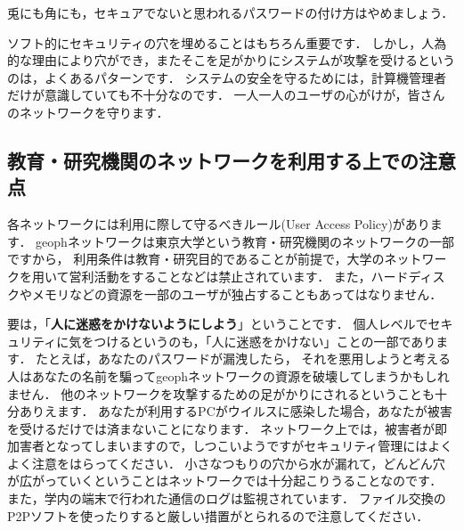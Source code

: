 \documentclass{jarticle}
\begin{document}
兎にも角にも，セキュアでないと思われるパスワードの付け方はやめましょう．

ソフト的にセキュリティの穴を埋めることはもちろん重要です．
しかし，人為的な理由により穴ができ，またそこを足がかりにシステムが攻撃を受けるというのは，よくあるパターンです．
システムの安全を守るためには，計算機管理者だけが意識していても不十分なのです．
一人一人のユーザの心がけが，皆さんのネットワークを守ります．

\subsection{教育・研究機関のネットワークを利用する上での注意点}
各ネットワークには利用に際して守るべきルール(User Access Policy)があります．
geophネットワークは東京大学という教育・研究機関のネットワークの一部ですから，
利用条件は教育・研究目的であることが前提で，大学のネットワークを用いて営利活動をすることなどは禁止されています．
また，ハードディスクやメモリなどの資源を一部のユーザが独占することもあってはなりません．
 
要は，「{\bf 人に迷惑をかけないようにしよう}」ということです．
個人レベルでセキュリティに気をつけるというのも，「人に迷惑をかけない」ことの一部であります．
たとえば，あなたのパスワードが漏洩したら，
それを悪用しようと考える人はあなたの名前を騙ってgeophネットワークの資源を破壊してしまうかもしれません．
他のネットワークを攻撃するための足がかりにされるということも十分ありえます．
あなたが利用するPCがウイルスに感染した場合，あなたが被害を受けるだけでは済まないことになります．
ネットワーク上では，被害者が即加害者となってしまいますので，しつこいようですがセキュリティ管理にはよくよく注意をはらってください．
小さなつもりの穴から水が漏れて，どんどん穴が広がっていくということはネットワークでは十分起こりうることなのです．
また，学内の端末で行われた通信のログは監視されています．
ファイル交換のP2Pソフトを使ったりすると厳しい措置がとられるので注意してください．

\newpage
\end{document}
